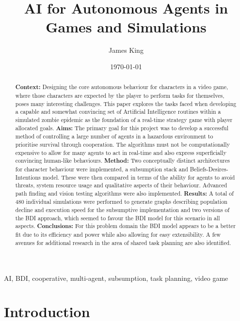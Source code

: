 \documentclass[12pt,a4paper]{article}
\title{AI for Autonomous Agents in Games and Simulations}
\author{James King}
\date{\today}
\begin{document}
\maketitle

\begin{abstract} {\bf Context:} Designing the core autonomous behaviour for characters in a video game, where those characters are expected by the player to perform tasks for themselves, poses many interesting challenges. This paper explores the tasks faced when developing a capable and somewhat convincing set of Artificial Intelligence routines within a simulated zombie epidemic as the foundation of a real-time strategy game with player allocated goals.
{\bf Aims:} The primary goal for this project was to develop a successful method of controlling a large number of agents in a hazardous environment to prioritise survival through cooperation. The algorithms must not be computationally expensive to allow for many agents to act in real-time and also express superficially convincing human-like behaviours.
{\bf Method:} Two conceptually distinct architectures for character behaviour were implemented, a subsumption stack and Beliefs-Desires-Intentions model. These were then compared in terms of the ability for agents to avoid threats, system resource usage and qualitative aspects of their behaviour. Advanced path finding and vision testing algorithms were also implemented.
{\bf Results:} A total of 480 individual simulations were performed to generate graphs describing population decline and execution speed for the subsumptive implementation and two versions of the BDI approach, which seemed to favour the BDI model for this scenario in all aspects.
{\bf Conclusions:} For this problem domain the BDI model appears to be a better fit due to its efficiency and power while also allowing for easy extensibility. A few avenues for additional research in the area of shared task planning are also identified.
\end{abstract}

\begin{keywords}
AI, BDI, cooperative, multi-agent, subsumption, task planning, video game
\end{keywords}

\section{Introduction}
\end{document}
